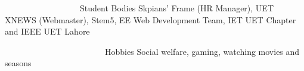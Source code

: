 \begin{cvskills}
	\cvskill
	{~~~~~~~~~~~~~~~~~~Student Bodies}
	{Skpians' Frame (HR Manager), UET XNEWS (Webmaster), Stem5, EE Web Development Team, IET UET Chapter and IEEE UET Lahore}
	
%	
	\cvskill
	{~~~~~~~~~~~~~~~~~~~~~~~~Hobbies}
	{Social welfare, gaming, watching movies and seasons}
\end{cvskills}
